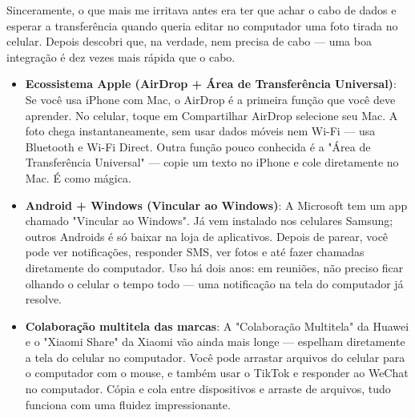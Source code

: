


Sinceramente, o que mais me irritava antes era ter que achar o cabo de dados e esperar a transferência quando queria editar no computador uma foto tirada no celular. Depois descobri que, na verdade, nem precisa de cabo — uma boa integração é dez vezes mais rápida que o cabo.

\begin{itemize}
  \item \textbf{Ecossistema Apple (AirDrop + Área de Transferência Universal)}: Se você usa iPhone com Mac, o AirDrop é a primeira função que você deve aprender. No celular, toque em Compartilhar AirDrop selecione seu Mac. A foto chega instantaneamente, sem usar dados móveis nem Wi-Fi — usa Bluetooth e Wi-Fi Direct. Outra função pouco conhecida é a "Área de Transferência Universal" — copie um texto no iPhone e cole diretamente no Mac. É como mágica.
  \item \textbf{Android + Windows (Vincular ao Windows)}: A Microsoft tem um app chamado "Vincular ao Windows". Já vem instalado nos celulares Samsung; outros Androids é só baixar na loja de aplicativos. Depois de parear, você pode ver notificações, responder SMS, ver fotos e até fazer chamadas diretamente do computador. Uso há dois anos: em reuniões, não preciso ficar olhando o celular o tempo todo — uma notificação na tela do computador já resolve.
  \item \textbf{Colaboração multitela das marcas}: A "Colaboração Multitela" da Huawei e o "Xiaomi Share" da Xiaomi vão ainda mais longe — espelham diretamente a tela do celular no computador. Você pode arrastar arquivos do celular para o computador com o mouse, e também usar o TikTok e responder ao WeChat no computador. Cópia e cola entre dispositivos e arraste de arquivos, tudo funciona com uma fluidez impressionante.
\end{itemize}


